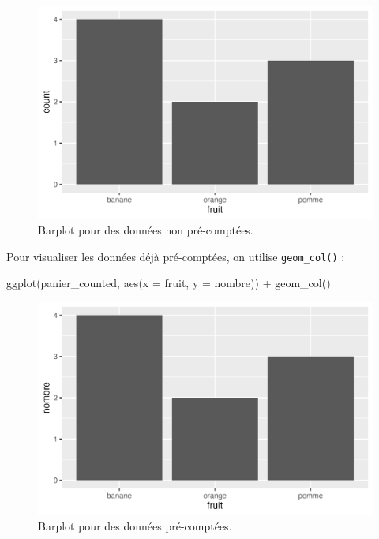 \documentclass[
  letterpaper,
  DIV=11,
  numbers=noendperiod]{scrreprt}
\newenvironment{Shaded}{\begin{snugshade}}{\end{snugshade}}
\newcommand{\AttributeTok}[1]{\textcolor[rgb]{0.40,0.45,0.13}{#1}}
\newcommand{\FunctionTok}[1]{\textcolor[rgb]{0.28,0.35,0.67}{#1}}
\newcommand{\NormalTok}[1]{\textcolor[rgb]{0.00,0.23,0.31}{#1}}
\newcommand{\SpecialCharTok}[1]{\textcolor[rgb]{0.37,0.37,0.37}{#1}}
\begin{document}
\begin{figure}[H]

{\centering \includegraphics{./03-visualization_files/figure-pdf/fig-barplot-1.png}

}

\caption{\label{fig-barplot}Barplot pour des données non pré-comptées.}

\end{figure}

Pour visualiser les données déjà pré-comptées, on utilise
\texttt{geom\_col()} :

\begin{Shaded}
\begin{Highlighting}[]
\FunctionTok{ggplot}\NormalTok{(panier\_counted, }\FunctionTok{aes}\NormalTok{(}\AttributeTok{x =}\NormalTok{ fruit, }\AttributeTok{y =}\NormalTok{ nombre)) }\SpecialCharTok{+}
  \FunctionTok{geom\_col}\NormalTok{()}
\end{Highlighting}
\end{Shaded}

\begin{figure}[H]

{\centering \includegraphics{./03-visualization_files/figure-pdf/fig-barplotcol-1.png}

}

\caption{\label{fig-barplotcol}Barplot pour des données pré-comptées.}

\end{figure}
\end{document}
